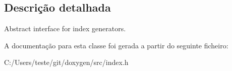 \subsection{Descrição detalhada}
Abstract interface for index generators. 

A documentação para esta classe foi gerada a partir do seguinte ficheiro\-:\begin{DoxyCompactItemize}
\item 
C\-:/\-Users/teste/git/doxygen/src/index.\-h\end{DoxyCompactItemize}
